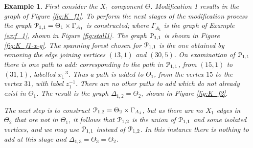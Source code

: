 \documentclass[a4paper,12pt]{article}
\newcommand{\G}{\Gamma }
\newcommand{\D}{\Delta }
\newcommand{\T}{\Theta }
\newcommand{\cP}{{\cal{P}}}
\newtheorem{exam}[theorem]{Example}
\newenvironment{example}{\begin{exam} \rm}{\end{exam}}
\numberwithin{equation}{section}
\numberwithin{figure}{section}
\begin{document}
\begin{example}
First consider the $X_1$ component $\Theta$. Modification 1
results in the graph of Figure \ref{fig:K_f1}. To perform the next
stages of the  modification process the graph  $\cP_{1,1}=\Theta_1 \times
\G_{A_1}$ is constructed; where $\G_{A_1}$ is the graph of Example
\ref{ex:f_1}, shown in Figure \ref{fig:stall1}. The  graph
$\cP_{1,1}$ is shown in Figure \ref{fig:K_f1-x-g}. The spanning forest
chosen for $\cP_{1,1}$ is the one obtained by removing the edge
joining vertices $(13,1)$ and $(30,5)$. On examination of $\cP_{1,1}$
there is one path to add: corresponding to the path in $\cP_{1,1}$,
from $(15,1)$ to $(31,1)$, labelled $x_1^{-3}$. Thus a path is
added to $\T_1$, from the vertex $15$ to the vertex $31$, with
label $z_1^{-1}$. There are no other paths to add which do not
already exist in $\T_1$. The result is  the graph $\D_{1,2}=\Theta_2$,
shown in Figure \ref{fig:K_f2}. 

The next step is to construct
$\cP_{1,2}=\T_2\times \G_{A_1}$, but as there are no $X_1$ edges in
$\T_2$ that are not in $\T_1$, it follows that  $\cP_{1,2}$ is the
union of $\cP_{1,1}$ and some isolated vertices, and we may use
$\cP_{1,1}$ instead of $\cP_{1,2}$. In this instance there is nothing to
add at this stage and $\D_{1,3}=\T_3=\T_2$.


\end{example}
\end{document}
